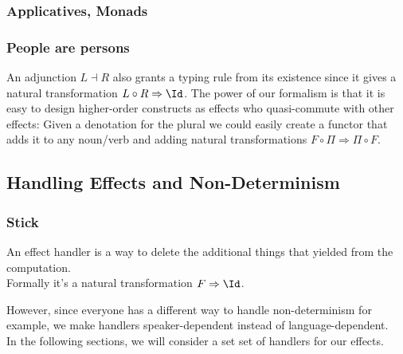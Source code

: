 \documentclass[math, english, info, noamsthm]{beamercours}
\begin{document}
\begin{frame}
	\frametitle{Applicatives, Monads}
	\pause
\end{frame}

\begin{frame}
	\frametitle{People are persons}
	An adjunction $L \dashv R$ also grants a typing rule from its existence since it gives a natural transformation $L \circ R \Rightarrow \Id$.
	\pause
	The power of our formalism is that it is easy to design higher-order constructs as effects who quasi-commute with other effects:
	Given a denotation for the plural we could easily create a functor that adds it to any noun/verb and adding natural transformations $F \circ \Pi \Rightarrow \Pi \circ F$.
\end{frame}

\subsection{Handling Effects and Non-Determinism}
\begin{frame}
	\frametitle{Stick}
	An effect handler is a way to delete the additional things that yielded from the computation. \\
	Formally it's a natural transformation $F \Rightarrow \Id$.\\

	\medskip

	However, since everyone has a different way to handle non-determinism for example, we make handlers speaker-dependent instead of language-dependent.\\
	In the following sections, we will consider a set set of handlers for our effects.
\end{frame}
\end{document}
